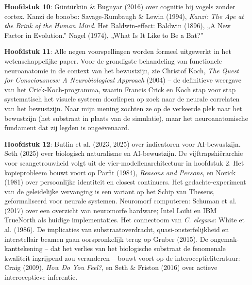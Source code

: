 \documentclass[11pt, twoside, openright]{book}
\begin{document}
\textbf{Hoofdstuk 10}: Güntürkün \& Bugnyar (2016) over cognitie bij vogels zonder cortex. Kanzi de bonobo: Savage-Rumbaugh \& Lewin (1994), \textit{Kanzi: The Ape at the Brink of the Human Mind}. Het Baldwin-effect: Baldwin (1896), „A New Factor in Evolution.” Nagel (1974), „What Is It Like to Be a Bat?”

\textbf{Hoofdstuk 11}: Alle negen voorspellingen worden formeel uitgewerkt in het wetenschappelijke paper. Voor de grondigste behandeling van functionele neuroanatomie in de context van het bewustzijn, zie Christof Koch, \textit{The Quest for Consciousness: A Neurobiological Approach} (2004) -- de definitieve weergave van het Crick-Koch-programma, waarin Francis Crick en Koch stap voor stap systematisch het visuele systeem doorliepen op zoek naar de neurale correlaten van het bewustzijn. Naar mijn mening zochten ze op de verkeerde plek naar het bewustzijn (het substraat in plaats van de simulatie), maar het neuroanatomische fundament dat zij legden is ongeëvenaard.

\textbf{Hoofdstuk 12}: Butlin et al. (2023, 2025) over indicatoren voor AI-bewustzijn. Seth (2025) over biologisch naturalisme en AI-bewustzijn. De vijftrapshiërarchie voor scangetrouwheid volgt uit de vier-modellenarchitectuur in hoofdstuk 2. Het kopieprobleem bouwt voort op Parfit (1984), \textit{Reasons and Persons}, en Nozick (1981) over persoonlijke identiteit en closest continuers. Het gedachte-experiment van de geleidelijke vervanging is een variant op het Schip van Theseus, geformaliseerd voor neurale systemen. Neuromorf computeren: Schuman et al. (2017) over een overzicht van neuromorfe hardware; Intel Loihi en IBM TrueNorth als huidige implementaties. Het connectoom van \textit{C. elegans}: White et al. (1986). De implicaties van substraatoverdracht, quasi-onsterfelijkheid en interstellair beamen gaan oorspronkelijk terug op Gruber (2015). De ongemak-kanttekening -- dat het verlies van het biologische substraat de fenomenale kwaliteit ingrijpend zou veranderen -- bouwt voort op de interoceptieliteratuur: Craig (2009), \textit{How Do You Feel?}, en Seth \& Friston (2016) over actieve interoceptieve inferentie.
\end{document}
